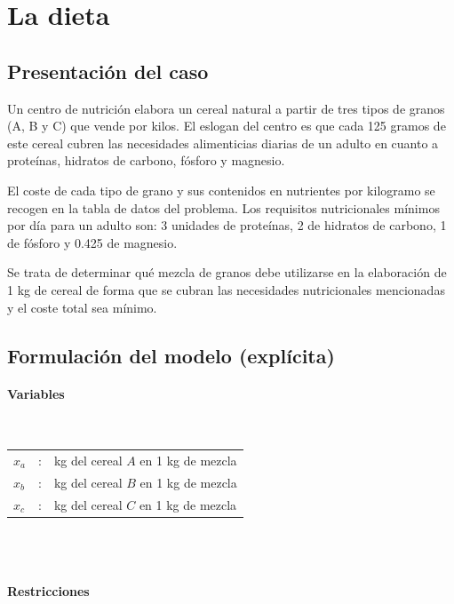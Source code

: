 \section{La dieta}

\subsection{Presentación del caso}

Un centro de nutrición elabora un cereal natural a partir de tres tipos de granos 
(A, B y C) que vende por kilos. El eslogan del centro es que cada 125 gramos de 
este cereal cubren las necesidades alimenticias diarias de un adulto en cuanto a 
proteínas, hidratos de carbono, fósforo y magnesio. 

El coste de cada tipo de grano y sus contenidos en nutrientes por kilogramo se 
recogen en la tabla de datos del problema. Los requisitos nutricionales mínimos 
por día para un adulto son: 3 unidades de proteínas, 2 de hidratos de carbono, 
1 de fósforo y 0.425 de magnesio. 

Se trata de determinar qué mezcla de granos debe utilizarse en la elaboración de 
1 kg de cereal de forma que se cubran las necesidades nutricionales mencionadas 
y el coste total sea mínimo.

\subsection{Formulación del modelo (explícita)}

\paragraph{Variables}\mbox{}\\

\begin{tabular}{l c p{9cm}}
    $x_a$ & : & kg del cereal $A$ en 1 kg de mezcla \\
    $x_b$ & : & kg del cereal $B$ en 1 kg de mezcla \\
    $x_c$ & : & kg del cereal $C$ en 1 kg de mezcla \\
\end{tabular}
\\
\\

\paragraph{Restricciones}\mbox{}\\

